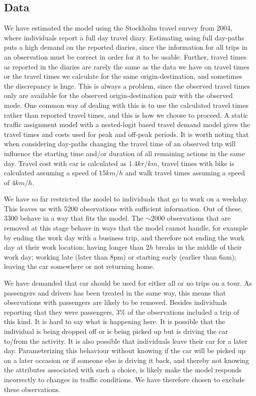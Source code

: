 \subsection{Data}
We have estimated the model using the Stockholm travel survey from 2004, where individuals report a full day travel diary. Estimating using full day-paths puts a high demand on the reported diaries, since the information for all trips in an observation must be correct in order for it to be usable. Further, travel times as reported in the diaries are rarely the same as the data we have on travel times or the travel times we calculate for the same origin-destination, and sometimes the discrepancy is huge. This is always a problem, since the observed travel times only are available for the observed origin-destination pair with the observed mode. One common way of dealing with this is to use the calculated travel times rather than reported travel times, and this is how we choose to proceed. A static traffic assignment model with a nested-logit based travel demand model gives the travel times and costs used for peak and off-peak periods. It is worth noting that when considering day-paths changing the travel time of an observed trip will influence the starting time and/or duration of all remaining actions in the same day. Travel cost with car is calculated as $1.4\unit{kr/km}$, travel times with bike is calculated assuming a speed of $15\unit{km/h}$ and walk travel times assuming a speed of $4\unit{km/h}$.

We have so far restricted the model to individuals that go to work on a weekday. This leaves us with 5200 observations with sufficient information. Out of these, 3300 behave in a way that fits the model. The $\sim 2000$ observations that are removed at this stage behave in ways that the model cannot handle, for example by ending the work day with a business trip, and therefore not ending the work day at their work location; having longer than $2h$ breaks in the middle of their work day; working late (later than 8pm) or starting early (earlier than 6am); leaving the car somewhere or not returning home.

We have demanded that car should be used for either all or no trips on a tour. As passengers and drivers has been treated in the same way, this means that observations with passengers are likely to be removed. Besides individuals reporting that they were passengers, $3\%$ of the observations included a trip of this kind. It is hard to say what is happening here. It is possible that the individual is being dropped off or is being picked up but is driving the car to/from the activity. It is also possible that individuals leave their car for a later day. Parameterizing this behaviour without knowing if the car will be picked up on a later occasion or if someone else is driving it back, and thereby not knowing the attributes associated with such a choice, is likely make the model responds incorrectly to changes in traffic conditions. We have therefore chosen to exclude these observations.






